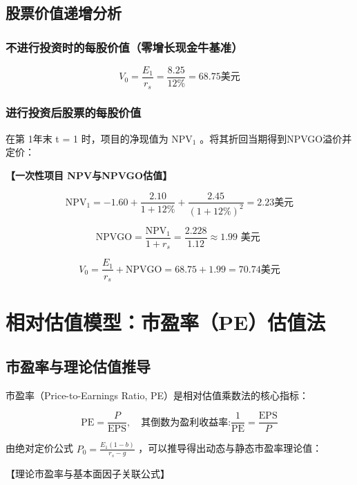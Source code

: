 \documentclass[lang=cn,10pt,color=blue]{elegantbook}
\begin{document}
\subsection{股票价值递增分析}

\subsubsection{不进行投资时的每股价值（零增长现金牛基准）}

$$
V _ {0} = \frac {E _ {1}}{r _ {s}} = \frac {8 . 2 5}{12 \%} = 6 8. 7 5 \text{美元}
$$

\subsubsection{进行投资后股票的每股价值}

在第 1年末 t = 1 时，项目的净现值为 $\mathrm { N P V _ { 1 } }$ 。将其折回当期得到NPVGO溢价并定价： 

\textbf{\color{UnivColor} 【一次性项目 NPV与NPVGO估值】} 

$$
\mathrm{NPV} _ {1} = - 1. 6 0 + \frac {2 . 1 0}{1 + 12 \%} + \frac {2 . 4 5}{(1 + 12 \%) ^ {2}} = 2. 2 3 \text{美元}
$$

$$
\mathrm{NPVGO} = \frac {\mathrm{NPV} _ {1}}{1 + r _ {s}} = \frac {2 . 2 2 8}{1 . 1 2} \approx 1. 9 9 \text { 美元 }
$$

$$
V _ {0} = \frac {E _ {1}}{r _ {s}} + \mathrm{NPVGO} = 6 8. 7 5 + 1. 9 9 = 7 0. 7 4 \text {美元}
$$

\section{相对估值模型：市盈率（PE）估值法}

\subsection{市盈率与理论估值推导}

市盈率（Price-to-Earnings Ratio, PE）是相对估值乘数法的核心指标： 

$$
\boxed {\mathrm {P E} = \frac {P}{\mathrm {E P S}}, \quad \text {其倒数为盈利收益率:} \frac {1}{\mathrm {P E}} = \frac {\mathrm {E P S}}{P}}
$$

由绝对定价公式 $\displaystyle { P _ { 0 } } = \frac { { E _ { 1 } } \left( 1 - b \right) } { { r _ { s } } - g }$ ，可以推导得出动态与静态市盈率理论值： 

【理论市盈率与基本面因子关联公式】 
\end{document}
